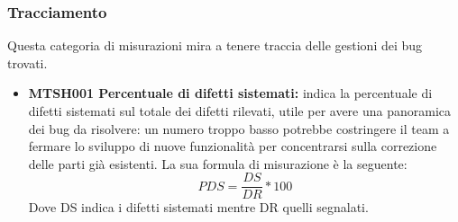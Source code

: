 \documentclass[NormeDiProgetto.tex]{subfiles}
\begin{document}
	\subsubsection{Tracciamento}
	Questa categoria di misurazioni mira a tenere traccia delle gestioni dei bug trovati.
	\begin{itemize}
		\item \textbf{MTSH001 Percentuale di difetti sistemati:} indica la percentuale di difetti sistemati sul totale dei difetti rilevati, utile per avere una panoramica dei bug da risolvere: un numero troppo basso potrebbe costringere il team a fermare lo sviluppo di nuove funzionalità per concentrarsi sulla correzione delle parti già esistenti. La sua formula di misurazione è la seguente:
		\[PDS=\dfrac{DS}{DR}*100\]
		Dove DS indica i difetti sistemati mentre DR quelli segnalati.	
	\end{itemize}
\end{document}
